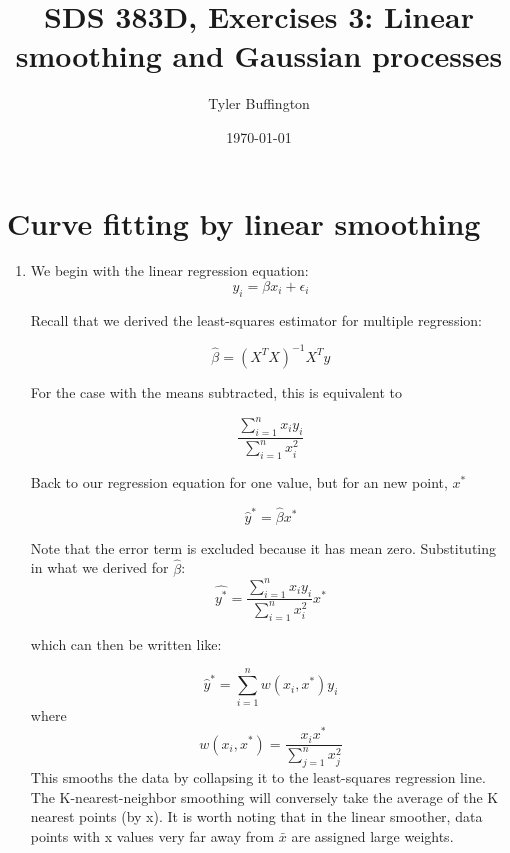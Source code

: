 \documentclass[10pt]{article}
\begin{document}
    \title{SDS 383D, Exercises 3: Linear smoothing and Gaussian processes}
    \author{Tyler Buffington}
    \date{\today}
    \maketitle

    \section*{Curve fitting by linear smoothing}
    \begin{enumerate}[label=(\Alph*)]
    \item
    
    We begin with the linear regression equation:
    $$y_i = \beta x_i + \epsilon_i$$
       
    Recall that we derived the least-squares estimator for multiple regression:

    $$\hat{\beta} = (X^TX)^{-1}X^Ty$$

    For the case with the means subtracted, this is equivalent to 
        
    $$\frac{\sum_{i=1}^{n}x_iy_i}{\sum_{i=1}^{n}x_i^2}$$

    Back to our regression equation for one value, but for an new point, $x^*$

    $$\hat{y}^* = \hat{\beta}x^*$$

    Note that the error term is excluded because it has mean zero. Substituting in what we derived for $\hat{\beta}$:
    $$\hat{y^*} =\frac{\sum_{i=1}^{n}x_iy_i}{\sum_{i=1}^{n}x_i^2}x^*$$

    which can then be written like:

    $$\hat{y}^* = \sum_{i=1}^{n}w(x_i,x^*)y_i$$
    where
    $$w(x_i,x^*)= \frac{x_ix^*}{\sum_{j=1}^{n}x_j^2}$$
    This smooths the data by collapsing it to the least-squares regression line. The K-nearest-neighbor smoothing will conversely take the average of the K nearest points (by x). It is worth noting that in the linear smoother, data points with x values very far away from $\bar{x}$ are assigned large weights.	


\end{enumerate}
\end{document}
